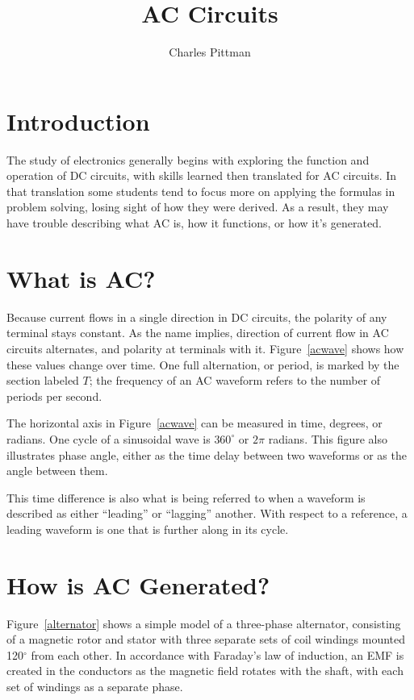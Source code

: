 \documentclass[12pt]{article}
\author{Charles Pittman}
\title{AC Circuits}
\begin{document}
  \maketitle

  \section*{Introduction}
  The study of electronics generally begins with exploring the function and
  operation of \ac{DC} circuits, with skills learned then translated for
  \ac{AC} circuits.  In that translation some students tend to focus more on
  applying the formulas in problem solving, losing sight of how they were
  derived.  As a result, they may have trouble describing what \ac{AC} is, how
  it functions, or how it's generated.

  \section*{What is \ac{AC}?}
  Because current flows in a single direction in \ac{DC} circuits, the polarity
  of any terminal stays constant.  As the name implies, direction of current
  flow in \ac{AC} circuits alternates, and polarity at terminals with it.
  Figure~\ref{acwave} shows how these values change over time.  One full
  alternation, or period, is marked by the section labeled $T$; the frequency
  of an \ac{AC} waveform refers to the number of periods per second.

  The horizontal axis in Figure~\ref{acwave} can be measured in time, degrees,
  or radians.  One cycle of a sinusoidal wave is $360^\circ$ or $2\pi$ radians.
  This figure also illustrates phase angle, either as the time delay between
  two waveforms or as the angle between them.

  This time difference is also what is being referred to when a waveform is
  described as either ``leading'' or ``lagging'' another.  With respect to a
  reference, a leading waveform is one that is further along in its cycle.

  \section*{How is \ac{AC} Generated?}
  Figure~\ref{alternator} shows a simple model of a three-phase alternator,
  consisting of a magnetic rotor and stator with three separate sets of coil
  windings mounted 120$^\circ$ from each other.  In accordance with Faraday's
  law of induction, an \ac{EMF} is created in the conductors as the magnetic
  field rotates with the shaft, with each set of windings as a separate phase.
\end{document}
